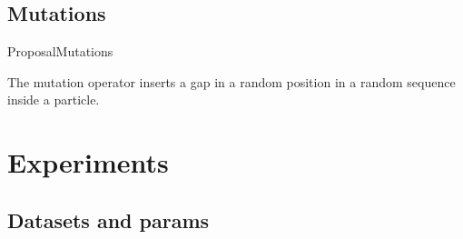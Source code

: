 \documentclass[10pt]{beamer}
\newcommand{\1}{
        	\setbeamertemplate{background}{
        		\texttt{[image: img/1]}
        		\tikz[overlay] \fill[fill opacity=0.75,fill=white] (0,0) rectangle (-\paperwidth,\paperheight);
        	}
}
\begin{document}
\subsection{Mutations}

\begin{frame}{Proposal}{Mutations}
	
	\begin{block}{}
		The mutation operator inserts a gap in a random position in a random sequence inside a particle.
	\end{block}	
	
\end{frame}

\section{Experiments}

\subsection{Datasets and params}
\end{document}
